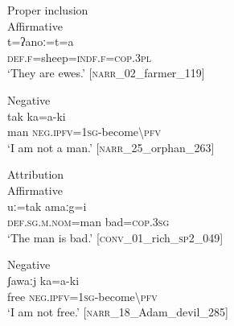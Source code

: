 \documentclass[output=paper,colorlinks,citecolor=brown]{langscibook}
\begin{document}

\ea\label{ex:beja:16}
{Proper inclusion}\\
    \ea\label{ex:beja:16a}
    {Affirmative}\\
        \gll   t=ʔanoː=t=a\\
             \textsc{def.f}=sheep=\textsc{indf.f=cop.3pl}\\
        \glt `They are ewes.' [\textsc{narr}\_02\_farmer\_119]
    
    \ex\label{ex:beja:16b}
    {Negative}\\
        \gll  tak ka=a-ki\\
             man \textsc{neg.ipfv=1sg}{}-become{\textbackslash}\textsc{pfv}\\
        \glt `I am not a man.' [\textsc{narr}\_25\_orphan\_263]
    \z
\z 

\ea\label{ex:beja:17} 
{Attribution}\\
    \ea\label{ex:beja:17a}
    Affirmative\\
        \gll uː=tak amaːg=i\\
             \textsc{def.sg.m.nom=}man bad=\textsc{cop.3sg} \\
        \glt `The man is bad.' [\textsc{conv}\_01\_rich\_\textsc{sp2}\_049]
    
    \ex\label{ex:beja:17b}
    Negative\\
        \gll ʃawaːj ka=a-ki\\
             free \textsc{neg.ipfv=1sg}{}-become{\textbackslash}\textsc{pfv}\\
        \glt `I am not free.' [\textsc{narr}\_18\_Adam\_devil\_285]
    \z
\z
\end{document}
